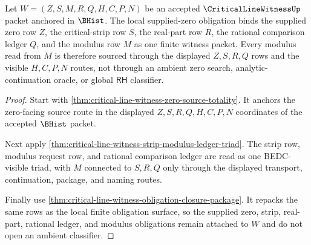 \begin{theorem}
\label{thm:critical-line-witness-supplied-zero-modulus-obligation}
Let $W=(Z,S,M,R,Q,H,C,P,N)$ be an accepted $\CriticalLineWitnessUp$ packet anchored in $\BHist$. The local supplied-zero obligation binds the supplied zero row $Z$, the critical-strip row $S$, the real-part row $R$, the rational comparison ledger $Q$, and the modulus row $M$ as one finite witness packet. Every modulus read from $M$ is therefore sourced through the displayed $Z,S,R,Q$ rows and the visible $H,C,P,N$ routes, not through an ambient zero search, analytic-continuation oracle, or global $\mathsf{RH}$ classifier.
\end{theorem}
\begin{proof}
Start with \autoref{thm:critical-line-witness-zero-source-totality}. It anchors the zero-facing source route in the displayed $Z,S,R,Q,H,C,P,N$ coordinates of the accepted $\BHist$ packet.

Next apply \autoref{thm:critical-line-witness-strip-modulus-ledger-triad}. The strip row, modulus request row, and rational comparison ledger are read as one BEDC-visible triad, with $M$ connected to $S,R,Q$ only through the displayed transport, continuation, package, and naming routes.

Finally use \autoref{thm:critical-line-witness-obligation-closure-package}. It repacks the same rows as the local finite obligation surface, so the supplied zero, strip, real-part, rational ledger, and modulus obligations remain attached to $W$ and do not open an ambient classifier.
\end{proof}

